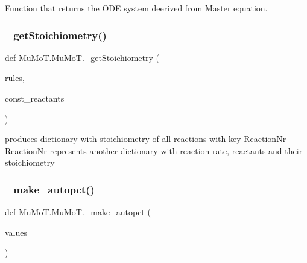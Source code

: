 Function that returns the O\+DE system deerived from Master equation. 

\mbox{\label{namespace_mu_mo_t_1_1_mu_mo_t_a6efd37b7d1bd1b5487b94a6083fa4eb4}} 
\subsubsection{\texorpdfstring{\+\_\+get\+Stoichiometry()}{\_getStoichiometry()}}
{\footnotesize\ttfamily def Mu\+Mo\+T.\+Mu\+Mo\+T.\+\_\+get\+Stoichiometry (\begin{DoxyParamCaption}\item[{}]{rules,  }\item[{}]{const\+\_\+reactants }\end{DoxyParamCaption})\hspace{0.3cm}{\ttfamily [private]}}



produces dictionary with stoichiometry of all reactions with key Reaction\+Nr Reaction\+Nr represents another dictionary with reaction rate, reactants and their stoichiometry 

\mbox{\label{namespace_mu_mo_t_1_1_mu_mo_t_a4820dd5a417c2c593d10deacd3dc1b03}} 
\subsubsection{\texorpdfstring{\+\_\+make\+\_\+autopct()}{\_make\_autopct()}}
{\footnotesize\ttfamily def Mu\+Mo\+T.\+Mu\+Mo\+T.\+\_\+make\+\_\+autopct (\begin{DoxyParamCaption}\item[{}]{values }\end{DoxyParamCaption})\hspace{0.3cm}{\ttfamily [private]}}

\mbox{\label{namespace_mu_mo_t_1_1_mu_mo_t_aa92c55a994d799a87d6bc8e0b08372ba}} 
